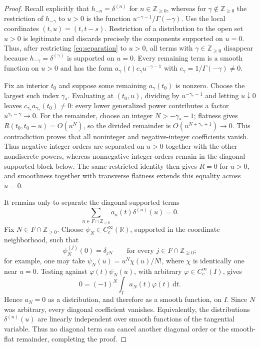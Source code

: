 \documentclass[11pt]{article}
\numberwithin{equation}{section}
\theoremstyle{definition}
\theoremstyle{remark}
\newcommand{\R}{\mathbb R}
\newcommand{\Z}{\mathbb Z}
\newcommand{\dd}{\,\mathrm d}
\begin{document}
\begin{proof}
Recall explicitly that $h_{-n}=\delta^{(n)}$ for $n\in\Z_{\ge0}$, whereas for $\gamma\notin\Z_{\ge0}$ the restriction of $h_{-\gamma}$ to $u>0$ is the function $u^{-\gamma-1}/\Gamma(-\gamma)$.
Use the local coordinates $(t,u)=(t,t-s)$. Restriction of a distribution to the open set $u>0$ is legitimate and discards precisely the components supported on $u=0$. Thus, after restricting \eqref{eq:separation} to $u>0$, all terms with $\gamma\in\Z_{\ge0}$ disappear because $h_{-\gamma}=\delta^{(\gamma)}$ is supported on $u=0$. Every remaining term is a smooth function on $u>0$ and has the form $a_\gamma(t)c_\gamma u^{-\gamma-1}$ with $c_\gamma=1/\Gamma(-\gamma)\ne0$.

Fix an interior $t_0$ and suppose some remaining $a_\gamma(t_0)$ is nonzero. Choose the largest such index $\gamma_*$. Evaluating at $(t_0,u)$, dividing by $u^{-\gamma_*-1}$ and letting $u\downarrow0$ leaves $c_{\gamma_*}a_{\gamma_*}(t_0)\ne0$: every lower generalized power contributes a factor $u^{\gamma_*-\gamma}\to0$. For the remainder, choose an integer $N>-\gamma_*-1$; flatness gives $R(t_0,t_0-u)=O(u^N)$, so the divided remainder is $O(u^{N+\gamma_*+1})\to0$. This contradiction proves that all noninteger and negative-integer coefficients vanish. Thus negative integer orders are separated on $u>0$ together with the other nondiscrete powers, whereas nonnegative integer orders remain in the diagonal-supported block below. The same restricted identity then gives $R=0$ for $u>0$, and smoothness together with transverse flatness extends this equality across $u=0$.

It remains only to separate the diagonal-supported terms
\begin{equation*}
\sum_{n\in F\cap\Z_{\ge0}}a_n(t)\delta^{(n)}(u)=0.
\end{equation*}
Fix $N\in F\cap\Z_{\ge0}$. Choose $\psi_N\in C_c^\infty(\R)$, supported in the coordinate neighborhood, such that
\begin{equation*}
\psi_N^{(j)}(0)=\delta_{jN}
\qquad\text{for every }j\in F\cap\Z_{\ge0};
\end{equation*}
for example, one may take $\psi_N(u)=u^N\chi(u)/N!$, where $\chi$ is identically one near $u=0$. Testing against $\varphi(t)\psi_N(u)$, with arbitrary $\varphi\in C_c^\infty(I)$, gives
\begin{equation*}
0=(-1)^N\int_I a_N(t)\varphi(t)\dd t.
\end{equation*}
Hence $a_N=0$ as a distribution, and therefore as a smooth function, on $I$. Since $N$ was arbitrary, every diagonal coefficient vanishes. Equivalently, the distributions $\delta^{(n)}(u)$ are linearly independent over smooth functions of the tangential variable. Thus no diagonal term can cancel another diagonal order or the smooth-flat remainder, completing the proof.
\end{proof}
\end{document}

